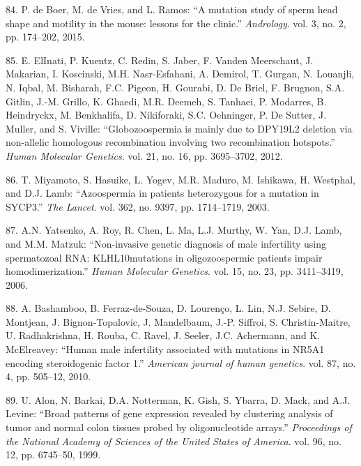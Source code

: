 \documentclass[12pt,twoside]{reedthesis}
\theoremstyle{definition}
\theoremstyle{definition}
\theoremstyle{remark}
\begin{document}
  \hypertarget{ref-DeBoer2015}{}
  84. P. de Boer, M. de Vries, and L. Ramos: ``A mutation study of sperm
  head shape and motility in the mouse: lessons for the clinic.''
  \emph{Andrology}. vol. 3, no. 2, pp. 174--202, 2015.
  
  \hypertarget{ref-ElInati2012}{}
  85. E. ElInati, P. Kuentz, C. Redin, S. Jaber, F. Vanden Meerschaut, J.
  Makarian, I. Koscinski, M.H. Nasr-Esfahani, A. Demirol, T. Gurgan, N.
  Louanjli, N. Iqbal, M. Bisharah, F.C. Pigeon, H. Gourabi, D. De Briel,
  F. Brugnon, S.A. Gitlin, J.-M. Grillo, K. Ghaedi, M.R. Deemeh, S.
  Tanhaei, P. Modarres, B. Heindryckx, M. Benkhalifa, D. Nikiforaki, S.C.
  Oehninger, P. De Sutter, J. Muller, and S. Viville: ``Globozoospermia is
  mainly due to DPY19L2 deletion via non-allelic homologous recombination
  involving two recombination hotspots.'' \emph{Human Molecular Genetics}.
  vol. 21, no. 16, pp. 3695--3702, 2012.
  
  \hypertarget{ref-Miyamoto2003}{}
  86. T. Miyamoto, S. Hasuike, L. Yogev, M.R. Maduro, M. Ishikawa, H.
  Westphal, and D.J. Lamb: ``Azoospermia in patients heterozygous for a
  mutation in SYCP3.'' \emph{The Lancet}. vol. 362, no. 9397, pp.
  1714--1719, 2003.
  
  \hypertarget{ref-Yatsenko2006}{}
  87. A.N. Yatsenko, A. Roy, R. Chen, L. Ma, L.J. Murthy, W. Yan, D.J.
  Lamb, and M.M. Matzuk: ``Non-invasive genetic diagnosis of male
  infertility using spermatozoal RNA: KLHL10mutations in oligozoospermic
  patients impair homodimerization.'' \emph{Human Molecular Genetics}.
  vol. 15, no. 23, pp. 3411--3419, 2006.
  
  \hypertarget{ref-Bashamboo2010}{}
  88. A. Bashamboo, B. Ferraz-de-Souza, D. Lourenço, L. Lin, N.J. Sebire,
  D. Montjean, J. Bignon-Topalovic, J. Mandelbaum, J.-P. Siffroi, S.
  Christin-Maitre, U. Radhakrishna, H. Rouba, C. Ravel, J. Seeler, J.C.
  Achermann, and K. McElreavey: ``Human male infertility associated with
  mutations in NR5A1 encoding steroidogenic factor 1.'' \emph{American
  journal of human genetics}. vol. 87, no. 4, pp. 505--12, 2010.
  
  \hypertarget{ref-Alon1999}{}
  89. U. Alon, N. Barkai, D.A. Notterman, K. Gish, S. Ybarra, D. Mack, and
  A.J. Levine: ``Broad patterns of gene expression revealed by clustering
  analysis of tumor and normal colon tissues probed by oligonucleotide
  arrays.'' \emph{Proceedings of the National Academy of Sciences of the
  United States of America}. vol. 96, no. 12, pp. 6745--50, 1999.
  
\end{document}
